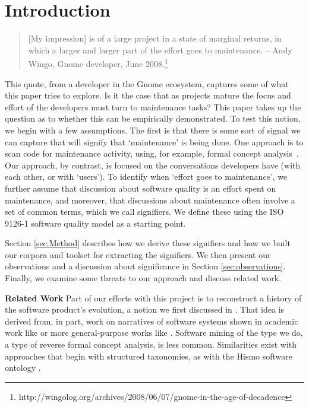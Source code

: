 \documentclass[conference, compsoc]{IEEEtran}
\begin{document}
\section{Introduction}\label{sect:introduction}%
\vspace{-2mm}
\begin{quote}[My impression] is of a large project in a state of marginal returns, in which a larger and larger part of the effort goes to maintenance. -- Andy Wingo, Gnome developer, June 2008.\footnote{http://wingolog.org/archives/2008/06/07/gnome-in-the-age-of-decadence}\end{quote}
	This quote, from a developer in the Gnome ecosystem, captures some of what this paper tries to explore. Is it the case that as projects mature the focus and effort of the developers must turn to maintenance tasks\cite{Swanson1976}? %
This paper takes up the question as to whether this can be empirically demonstrated. To test this notion, we begin with a few assumptions. The first is that there is some sort of signal we can capture that will signify that `maintenance' is being done. One approach is to scan code for maintenance activity, using, for example, formal concept analysis~\cite{breu06msr}. Our approach, by contrast, is focused on the conversations developers have (with each other, or with `users'). To identify when `effort goes to maintenance', we further assume that discussion about software quality is an effort spent on maintenance, and moreover, that discussions about maintenance often involve a set of common terms, which we call signifiers. We define these using the ISO 9126-1 software quality model \cite{iso9126} as a starting point. 
	
Section \ref{sec:Method} describes how we derive these signifiers and how we built our corpora and toolset for extracting the signifiers. We then present our observations and a discussion about significance in Section \ref{sec:observations}. Finally, we examine some threats to our approach and discuss related work. 

\noindent\textbf{Related Work}
Part of our efforts with this project is to reconstruct a history of the software product's evolution, a notion we first discussed in \cite{Ernst07icsm}. That idea is derived from, in part, work on narratives of software systems shown in academic work like \cite{Anton2001} or more general-purpose works like \cite{waldo93}. Software mining of the type we do, a type of reverse formal concept analysis, is less common. Similarities exist with approaches that begin with structured taxonomies, as with the Hismo software ontology \cite{Girba2006}.
	
\end{document}
